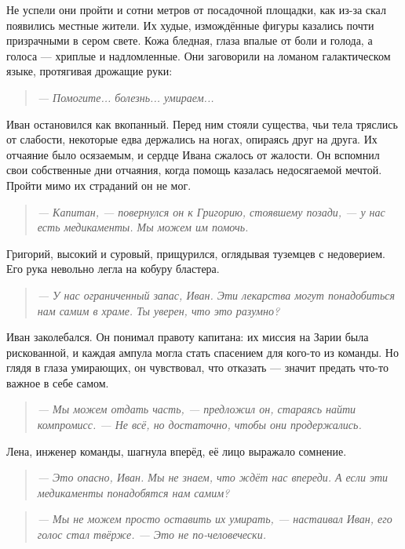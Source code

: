 \documentclass[12pt,a4paper]{book} %
\newenvironment{dialogue}{\begin{quote}\itshape}{\end{quote}}
\begin{document}
Не успели они пройти и сотни метров от посадочной площадки, как из-за скал появились местные жители. Их худые, измождённые фигуры казались почти призрачными в сером свете. Кожа бледная, глаза впалые от боли и голода, а голоса --- хриплые и надломленные. Они заговорили на ломаном галактическом языке, протягивая дрожащие руки:

\begin{dialogue}
--- Помогите... болезнь... умираем...
\end{dialogue}

Иван остановился как вкопанный. Перед ним стояли существа, чьи тела тряслись от слабости, некоторые едва держались на ногах, опираясь друг на друга. Их отчаяние было осязаемым, и сердце Ивана сжалось от жалости. Он вспомнил свои собственные дни отчаяния, когда помощь казалась недосягаемой мечтой. Пройти мимо их страданий он не мог.

\begin{dialogue}
--- Капитан, --- повернулся он к Григорию, стоявшему позади, --- у нас есть медикаменты. Мы можем им помочь.
\end{dialogue}

Григорий, высокий и суровый, прищурился, оглядывая туземцев с недоверием. Его рука невольно легла на кобуру бластера.

\begin{dialogue}
--- У нас ограниченный запас, Иван. Эти лекарства могут понадобиться нам самим в храме. Ты уверен, что это разумно?
\end{dialogue}

Иван заколебался. Он понимал правоту капитана: их миссия на Зарии была рискованной, и каждая ампула могла стать спасением для кого-то из команды. Но глядя в глаза умирающих, он чувствовал, что отказать --- значит предать что-то важное в себе самом.

\begin{dialogue}
--- Мы можем отдать часть, --- предложил он, стараясь найти компромисс. --- Не всё, но достаточно, чтобы они продержались.
\end{dialogue}

Лена, инженер команды, шагнула вперёд, её лицо выражало сомнение.

\begin{dialogue}
--- Это опасно, Иван. Мы не знаем, что ждёт нас впереди. А если эти медикаменты понадобятся нам самим?
\end{dialogue}

\begin{dialogue}
--- Мы не можем просто оставить их умирать, --- настаивал Иван, его голос стал твёрже. --- Это не по-человечески.
\end{dialogue}
\end{document}
